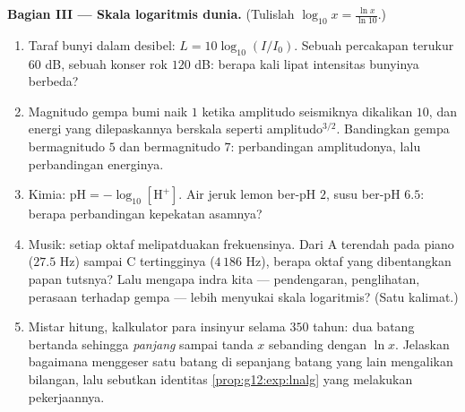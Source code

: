 \begin{problem}
\medskip
\noindent\textbf{Bagian III --- Skala logaritmis dunia.}
(Tulislah $\log_{10} x = \frac{\ln x}{\ln 10}$.)
\begin{enumerate}[resume]
  \item Taraf bunyi dalam desibel: $L = 10 \log_{10}(I/I_0)$. Sebuah
        percakapan terukur $60$ dB, sebuah konser rok $120$ dB:
        berapa kali lipat intensitas bunyinya berbeda?
  \item Magnitudo gempa bumi naik $1$ ketika
        amplitudo seismiknya dikalikan $10$, dan energi
        yang dilepaskannya berskala seperti amplitudo$^{3/2}$. Bandingkan
        gempa bermagnitudo $5$ dan bermagnitudo $7$: perbandingan
        amplitudonya, lalu perbandingan energinya.
  \item Kimia: $\text{pH} = -\log_{10}[\mathrm{H^+}]$.
        Air jeruk lemon ber-pH $2$, susu ber-pH $6.5$: berapa
        perbandingan kepekatan asamnya?
  \item Musik: setiap oktaf melipatduakan frekuensinya. Dari
        A terendah pada piano ($27.5$ Hz) sampai C tertingginya
        ($4\,186$ Hz), berapa oktaf yang dibentangkan papan tutsnya?
        Lalu mengapa indra kita --- pendengaran, penglihatan, perasaan
        terhadap gempa --- lebih menyukai skala logaritmis? (Satu kalimat.)
  \item Mistar hitung, kalkulator para insinyur selama $350$
        tahun: dua batang bertanda sehingga \emph{panjang}
        sampai tanda $x$ sebanding dengan $\ln x$. Jelaskan bagaimana
        menggeser satu batang di sepanjang batang yang lain mengalikan
        bilangan, lalu sebutkan identitas
        \cref{prop:g12:exp:lnalg} yang melakukan pekerjaannya.
\end{enumerate}


\end{problem}
